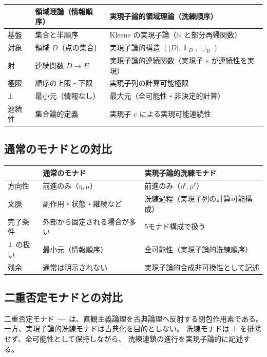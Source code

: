 \documentclass[11pt,a4paper]{article}
\theoremstyle{definition}
\newcommand{\etar}{\eta^{\mathrm{r}}}
\newcommand{\mur}{\mu^{\mathrm{r}}}
\newcommand{\Real}{\Vdash}
\begin{document}
\begin{center}
\begin{tabular}{lll}
\hline
& \textbf{領域理論（情報順序）} & \textbf{実現子論的領域理論（洗練順序）} \\
\hline
基盤 & 集合と半順序 & Kleene の実現子論（$\mathbb{N}$ と部分再帰関数） \\
対象 & 領域 $D$（点の集合） & 実現子論的構造 $(|D|,\Real_D,\sqsupseteq_D)$ \\
射 & 連続関数 $D\to E$ & 実現子論的連続関数（実現子 $e$ が連続性を実現） \\
極限 & 順序の上限・下限 & 実現子列の計算可能極限 \\
$\bot$ & 最小元（情報なし） & 最大元（全可能性・非決定的計算） \\
連続性 & 集合論的定義 & 実現子 $e$ による実現可能連続性 \\
\hline
\end{tabular}
\end{center}

\subsection{通常のモナドとの対比}

\begin{center}
\begin{tabular}{lll}
\hline
& \textbf{通常のモナド} & \textbf{実現子論的洗練モナド} \\
\hline
方向性 & 前進のみ（$\eta,\mu$） & 前進のみ（$\etar,\mur$） \\
文脈 & 副作用・状態・継続など & 洗練過程（実現子列の計算可能構成） \\
完了条件 & 外部から固定される場合が多い & 5モナド構成で扱う \\
$\bot$ の扱い & 最小元（情報順序） & 全可能性（実現子論的洗練順序） \\
残余 & 通常は明示されない & 実現子論的合成非可換性として記述 \\
\hline
\end{tabular}
\end{center}

\subsection{二重否定モナドとの対比}

二重否定モナド $\neg\neg$ は、直観主義論理を古典論理へ反射する閉包作用素である。
一方、実現子論的洗練モナドは古典化を目的としない。
洗練モナドは $\bot$ を排除せず、全可能性として保持しながら、
洗練連鎖の進行を実現子論的に記述する。
\end{document}
